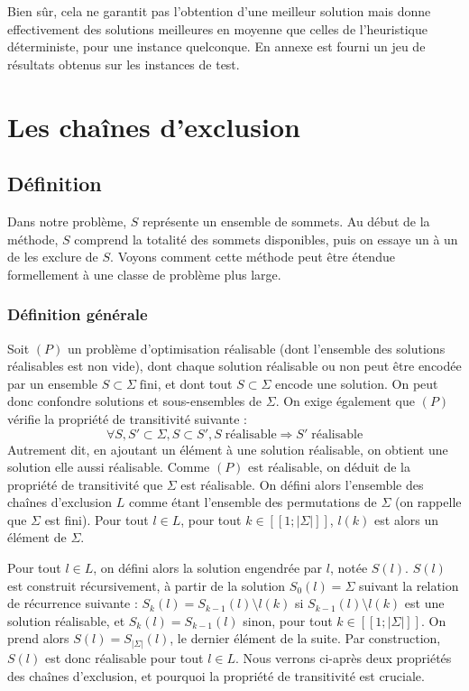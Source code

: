 \documentclass[12pt,a4paper]{article}
\begin{document}
Bien sûr, cela ne garantit pas l'obtention d'une meilleur solution mais donne effectivement des solutions meilleures en moyenne que celles de l'heuristique déterministe, pour une instance quelconque. En annexe est fourni un jeu de résultats obtenus sur les instances de test.

\newpage

\section{Les chaînes d'exclusion}
\subsection{Définition}
Dans notre problème, $S$ représente un ensemble de sommets. Au début de la méthode, $S$ comprend la totalité des sommets disponibles, puis on essaye un à un de les exclure de $S$. Voyons comment cette méthode peut être étendue formellement à une classe de problème plus large.

\subsubsection{Définition générale}
Soit $(P)$ un problème d'optimisation réalisable (dont l'ensemble des solutions réalisables est non vide), dont chaque solution réalisable ou non peut être encodée par un ensemble $S\subset \Sigma \;\text{fini}$, et dont tout $S\subset \Sigma$ encode une solution. On peut donc confondre solutions et sous-ensembles de $\Sigma$. On exige également que $(P)$  vérifie la propriété de transitivité suivante :
\[\forall S,S'\subset \Sigma,S\subset S',S \;\text{réalisable} \Rightarrow  S'\;\text{réalisable}\]
Autrement dit, en ajoutant un élément à une solution réalisable, on obtient une solution elle aussi réalisable. Comme $(P)$ est réalisable, on déduit de la propriété de transitivité que $\Sigma$ est réalisable. On défini alors l'ensemble des chaînes d'exclusion $L$ comme étant l'ensemble des permutations de $\Sigma$ (on rappelle que $\Sigma$ est fini). Pour tout $l\in L$, pour tout $k\in[\![1;|\Sigma |]\!]$, $l(k)$ est alors un élément de $\Sigma$.

Pour tout $l\in L$, on défini alors la solution engendrée par $l$, notée $S(l)$. $S(l)$ est construit récursivement, à partir de la solution $S_0(l)=\Sigma$ suivant la relation de récurrence suivante : $S_{k}(l)=S_{k-1}(l)\setminus l(k)$ si $S_{k-1}(l)\setminus l(k)$ est une solution réalisable, et $S_{k}(l)=S_{k-1}(l)$ sinon, pour tout $k\in[\![1;|\Sigma |]\!]$. On prend alors $S(l)=S_{|\Sigma |}(l)$, le dernier élément de la suite. Par construction, $S(l)$ est donc réalisable pour tout $l\in L$. Nous verrons ci-après deux propriétés des chaînes d'exclusion, et pourquoi la propriété de transitivité est cruciale.  
\end{document}
